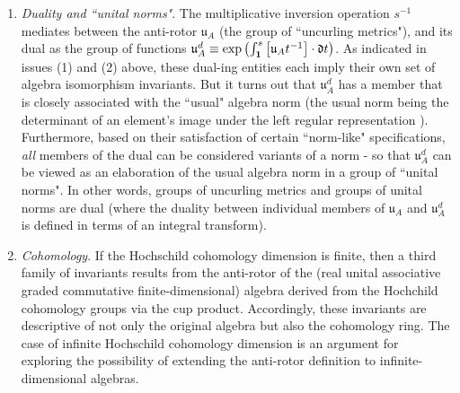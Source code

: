 \documentclass{amsart}
\numberwithin{equation}{section}
\theoremstyle{definition}
\numberwithin{theorem}{section}
\begin{document}
\begin{enumerate}
\item {\it Duality and ``unital norms"}. The multiplicative inversion operation $s^{-1}$ mediates between the anti-rotor $\mathfrak{u}_A$ (the group of ``uncurling metrics"), and its dual as the group of functions $\mathfrak{u}_A^d \equiv \text{exp}\left(\int_{{\bf 1}}^{s} \left[\mathfrak{u}_At^{-1}\right]\cdot \mathfrak{d}t\right)$.  As indicated in issues (1) and (2) above, these dual-ing entities each imply their own set of algebra isomorphism invariants.  But it turns out that $\mathfrak{u}_A^d$ has a member that is closely associated with the ``usual" algebra norm (the usual norm being the determinant of an element's image under the left regular representation \cite{bourbaki:1989}).   Furthermore, based on their satisfaction of certain ``norm-like" specifications, {\it all} members of the dual can be considered variants of a norm - so that $\mathfrak{u}_A^d$ can be viewed as an elaboration of the usual algebra norm in a group of ``unital norms".  In other words, groups of uncurling metrics and groups of unital norms are dual (where the duality between individual members of  $\mathfrak{u}_A$ and $\mathfrak{u}_A^d$ is defined in terms of an integral transform).
\item {\it Cohomology}. 
 If the Hochschild cohomology dimension is finite, then a third family of invariants results from the anti-rotor of the (real unital associative graded commutative finite-dimensional) algebra derived from the Hochchild \mbox{cohomology} groups via the cup product.  Accordingly, these invariants are descriptive of not only the original algebra but also the cohomology ring.  The case of infinite Hochschild cohomology dimension is an argument for exploring the possibility of extending the anti-rotor definition to infinite-dimensional algebras.  

\end{enumerate}
\end{document}
